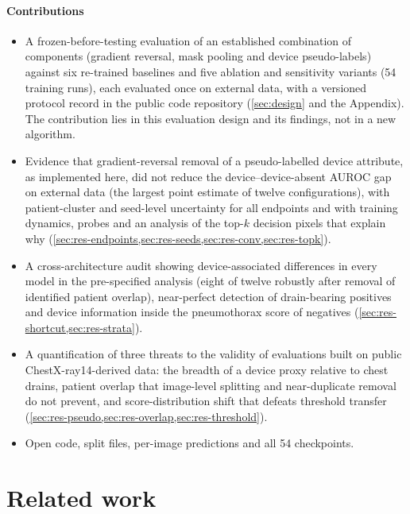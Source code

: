 \documentclass{ieeeaccess}
\begin{document}
\paragraph{Contributions}
\begin{itemize}
  \item A frozen-before-testing evaluation of an established combination of components (gradient reversal, mask pooling and device pseudo-labels) against six re-trained baselines and five ablation and sensitivity variants (54 training runs), each evaluated once on external data, with a versioned protocol record in the public code repository (\cref{sec:design} and the Appendix). The contribution lies in this evaluation design and its findings, not in a new algorithm.
  \item Evidence that gradient-reversal removal of a pseudo-labelled device attribute, as implemented here, did not reduce the device--device-absent AUROC gap on external data (the largest point estimate of twelve configurations), with patient-cluster and seed-level uncertainty for all endpoints and with training dynamics, probes and an analysis of the top-$k$ decision pixels that explain why (\cref{sec:res-endpoints,sec:res-seeds,sec:res-conv,sec:res-topk}).
  \item A cross-architecture audit showing device-associated differences in every model in the pre-specified analysis (eight of twelve robustly after removal of identified patient overlap), near-perfect detection of drain-bearing positives and device information inside the pneumothorax score of negatives (\cref{sec:res-shortcut,sec:res-strata}).
  \item A quantification of three threats to the validity of evaluations built on public ChestX-ray14-derived data: the breadth of a device proxy relative to chest drains, patient overlap that image-level splitting and near-duplicate removal do not prevent, and score-distribution shift that defeats threshold transfer (\cref{sec:res-pseudo,sec:res-overlap,sec:res-threshold}).
  \item Open code, split files, per-image predictions and all 54 checkpoints.
\end{itemize}

\section{Related work}
\label{sec:related}
\end{document}
